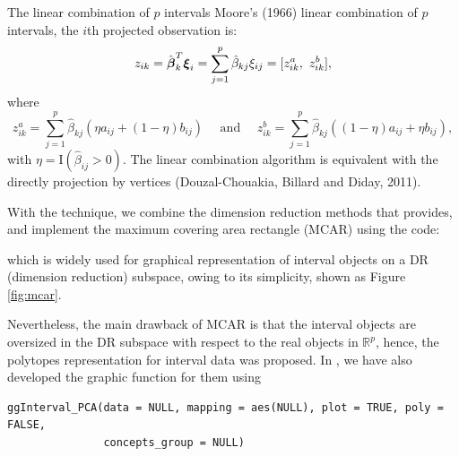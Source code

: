 \documentclass[article]{jss}
\newcommand{\mbf }[1]{\mbox{\boldmath ${#1}$}}
\begin{document}
 
The linear combination of
$p$ intervals
Moore's (1966) linear combination of
$p$ intervals, the $i$th projected observation is:
\[
z_{ik} = \hat{\mbf{\beta}}^T_k {\mbf \xi}_i =\sum_{j=1}^p
\hat{\beta}_{kj} \xi_{ij}=[z_{ik}^a,\ z_{ik}^b],
\]
where
\[
z_{ik}^a = \sum_{j=1}^p \hat{\beta}_{kj}(\eta a_{ij} + (1-\eta) b_{ij})\quad
\mbox{ and } \quad
z_{ik}^b = \sum_{j=1}^p \hat{\beta}_{kj}((1-\eta) a_{ij} + \eta b_{ij}),
\]
with $\eta=\mbox{I}(\hat{\beta}_{ij} > 0)$. The linear combination algorithm is 
equivalent with the directly
projection by vertices (Douzal-Chouakia, Billard and Diday,
2011).

With the technique, we combine the dimension reduction methods that  provides, and implement the maximum covering area rectangle (MCAR) \cite{cazes1997extension} using the code:

\begin{CodeChunk}
\end{CodeChunk}

which is widely used for graphical representation of interval objects on a DR (dimension reduction) subspace, owing to its simplicity, shown as Figure \ref{fig:mcar}. 


Nevertheless, the main drawback of MCAR is that the interval objects are oversized in the DR subspace with respect to the real objects in $^p$, hence, the polytopes representation \cite{le2012symbolic} for interval data was proposed. In , we have also developed the graphic function for them using 

\begin{verbatim}
ggInterval_PCA(data = NULL, mapping = aes(NULL), plot = TRUE, poly = FALSE, 
               concepts_group = NULL)
\end{verbatim}
\end{document}
